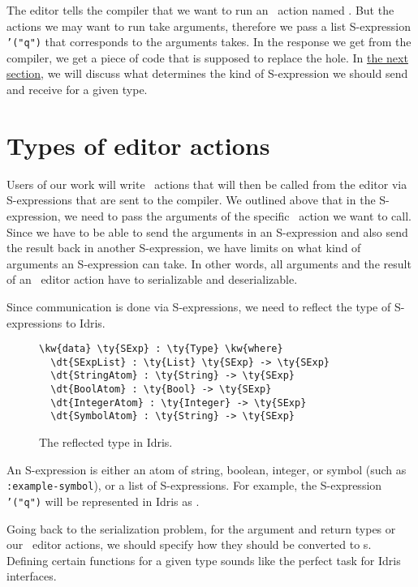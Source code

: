 The editor tells the compiler that we want to run an \Elab\ action named
. But the actions we may want to run take arguments, therefore we
pass a list S-expression \texttt{'("q")} that corresponds to the arguments
 takes.
In the response we get from the compiler, we get a piece of code that is
supposed to replace the hole. In \hyperref[sec:types]{the next section}, we
will discuss what determines the kind of S-expression we should send and
receive for a given type.

\section{Types of editor actions}\label{sec:types}

Users of our work will write \Elab\ actions that will then be called from the
editor via S-expressions that are sent to the compiler. We outlined above that
in the S-expression, we need to pass the arguments of the specific
\Elab\ action we want to call. Since we have to be able to send the arguments
in an S-expression and also send the result back in another S-expression, we
have limits on what kind of arguments an S-expression can take.
In other words, all arguments and the result of an \Elab\ editor action
have to serializable and deserializable.

Since communication is done via S-expressions, we need to reflect the type of
\mbox{S-expressions} to Idris.

\begin{figure}[H]
  \caption{The reflected type  in Idris.}
  \label{code:definitionSExp}
\begin{Verbatim}[framesep=2mm, label=\footnotesize{\normalfont{Idris}}, labelposition=topline]
\kw{data} \ty{SExp} : \ty{Type} \kw{where}
  \dt{SExpList} : \ty{List} \ty{SExp} -> \ty{SExp}
  \dt{StringAtom} : \ty{String} -> \ty{SExp}
  \dt{BoolAtom} : \ty{Bool} -> \ty{SExp}
  \dt{IntegerAtom} : \ty{Integer} -> \ty{SExp}
  \dt{SymbolAtom} : \ty{String} -> \ty{SExp}
\end{Verbatim}
\end{figure}

An S-expression is either an atom of string, boolean, integer, or symbol (such
as \texttt{:example-symbol}), or a list of S-expressions.
For example, the S-expression \texttt{'("q")} will be represented in Idris as
\mbox{}.

Going back to the serialization problem, for the argument and return types or
our \Elab\ editor actions, we should specify how they should be converted to
s.  Defining certain functions for a given type sounds like the
perfect task for Idris interfaces.

